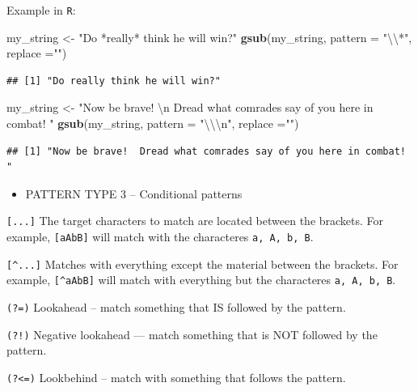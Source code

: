 \documentclass[]{book}
\newenvironment{Shaded}{\begin{snugshade}}{\end{snugshade}}
\newcommand{\KeywordTok}[1]{\textcolor[rgb]{0.13,0.29,0.53}{\textbf{#1}}}
\newcommand{\DataTypeTok}[1]{\textcolor[rgb]{0.13,0.29,0.53}{#1}}
\newcommand{\CharTok}[1]{\textcolor[rgb]{0.31,0.60,0.02}{#1}}
\newcommand{\StringTok}[1]{\textcolor[rgb]{0.31,0.60,0.02}{#1}}
\newcommand{\NormalTok}[1]{#1}
\providecommand{\tightlist}{%
  \setlength{\itemsep}{0pt}\setlength{\parskip}{0pt}}
\theoremstyle{definition}
\theoremstyle{definition}
\theoremstyle{definition}
\theoremstyle{remark}
\begin{document}
Example in \texttt{R}:

\begin{Shaded}
\begin{Highlighting}[]
\NormalTok{my_string <-}\StringTok{ "Do *really* think he will win?"}
\KeywordTok{gsub}\NormalTok{(my_string, }\DataTypeTok{pattern =} \StringTok{"}\CharTok{\textbackslash{}\textbackslash{}}\StringTok{*"}\NormalTok{, }\DataTypeTok{replace =}\StringTok{""}\NormalTok{)}
\end{Highlighting}
\end{Shaded}

\begin{verbatim}
## [1] "Do really think he will win?"
\end{verbatim}

\begin{Shaded}
\begin{Highlighting}[]
\NormalTok{my_string <-}\StringTok{ "Now be brave! }\CharTok{\textbackslash{}n}\StringTok{ Dread what comrades say of you here in combat! "}
\KeywordTok{gsub}\NormalTok{(my_string, }\DataTypeTok{pattern =} \StringTok{"}\CharTok{\textbackslash{}\textbackslash{}\textbackslash{}n}\StringTok{"}\NormalTok{, }\DataTypeTok{replace =}\StringTok{""}\NormalTok{) }
\end{Highlighting}
\end{Shaded}

\begin{verbatim}
## [1] "Now be brave!  Dread what comrades say of you here in combat! "
\end{verbatim}

\begin{itemize}
\tightlist
\item
  PATTERN TYPE 3 -- Conditional patterns
\end{itemize}

\texttt{{[}...{]}} The target characters to match are located between
the brackets. For example, \texttt{{[}aAbB{]}} will match with the
characteres \texttt{a,\ A,\ b,\ B}.

\texttt{{[}\^{}...{]}} Matches with everything except the material
between the brackets. For example, \texttt{{[}\^{}aAbB{]}} will match
with everything but the characteres \texttt{a,\ A,\ b,\ B}.

\texttt{(?=)} Lookahead -- match something that IS followed by the
pattern.

\texttt{(?!)} Negative lookahead --- match something that is NOT
followed by the pattern.

\texttt{(?\textless{}=)} Lookbehind -- match with something that follows
the pattern.
\end{document}
